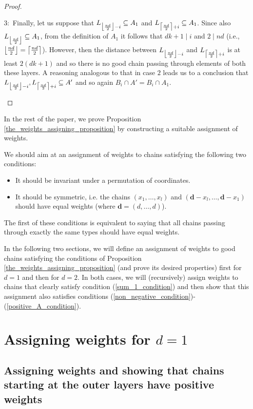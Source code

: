 \documentclass[11pt, reqno]{amsart}
\newenvironment{caseindent}[1][2em]
  {%
    \begin{list}{}{%
      \setlength{\leftmargin}{#1}%
      \setlength{\rightmargin}{0pt}%
      \setlength{\topsep}{0pt}%
      \setlength{\partopsep}{0pt}%
      \setlength{\itemsep}{0pt}%
      \setlength{\parsep}{\parskip}%
      \setlength{\listparindent}{\parindent}%
    }%
    \item[]%
    \let\fullwidthdisplay\relax
    \ignorespaces
  }
  {%
    \end{list}%
    \ignorespacesafterend
  }
\theoremstyle{remark}
\numberwithin{equation}{section}
\newcommand{\fclass}{\mathchoice
  {\left\lfloor \frac{nd}{2} \right\rfloor}
  {\big\lfloor \frac{nd}{2} \big\rfloor}
  {\big\lfloor \frac{nd}{2} \big\rfloor}
  {\big\lfloor \frac{nd}{2} \big\rfloor}}
\newcommand{\cclass}{\mathchoice
  {\left\lceil \frac{nd}{2} \right\rceil}
  {\big\lceil \frac{nd}{2} \big\rceil}
  {\big\lceil \frac{nd}{2} \big\rceil}
  {\big\lceil \frac{nd}{2} \big\rceil}}
\begin{document}
\begin{proof}
\begin{caseindent}
        $3:$ Finally, let us suppose that $L_{\fclass - i} \subseteq A_1$ and $L_{\cclass + i} \subseteq A_1$. Since also $L_{\fclass} \subseteq A_1$, from the definition of $A_1$ it follows that $dk+1 \mid i$ and $2 \mid nd$ (i.e., $\fclass=\cclass$). However, then the distance between $L_{\fclass - i}$ and $L_{\cclass + i}$ is at least $2(dk+1)$ and so there is no good chain passing through elements of both these layers. A reasoning analogous to that in case $2$ leads us to a conclusion that $L_{\fclass - i}, L_{\cclass + i} \subseteq A'$ and so again $B_i \cap A'=B_i \cap A_1$. \qedhere
        \end{caseindent}
\end{proof}

In the rest of the paper, we prove Proposition \ref{the_weights_assigning_proposition} by constructing a suitable assignment of weights.

We should aim at an assignment of weights to chains satisfying the following two conditions:
\begin{itemize}
    \item It should be invariant under a permutation of coordinates.
    \item It should be symmetric, i.e. the chains $(x_1, \ldots, x_l)$ and $(\textbf{d}-x_l, \ldots, \textbf{d}-x_1)$ should have equal weights (where $\textbf{d}=(d, \ldots, d)$).
\end{itemize}

The first of these conditions is equivalent to saying that all chains passing through exactly the same types should have equal weights.

In the following two sections, we will define an assignment of weights to good chains satisfying the conditions of Proposition \ref{the_weights_assigning_proposition} (and prove its desired properties) first for $d=1$ and then for $d=2$.  In both cases, we will (recursively) assign weights to chains that clearly satisfy condition (\ref{sum_1_condition}) and then show that this assignment also satisfies conditions (\ref{non_negative_condition})-(\ref{positive_A_condition}).

\section{Assigning weights for \texorpdfstring{$d=1$}{d=1}}
\label{section_d1}

\subsection{Assigning weights and showing that chains starting at the outer layers have positive weights}
\end{document}
